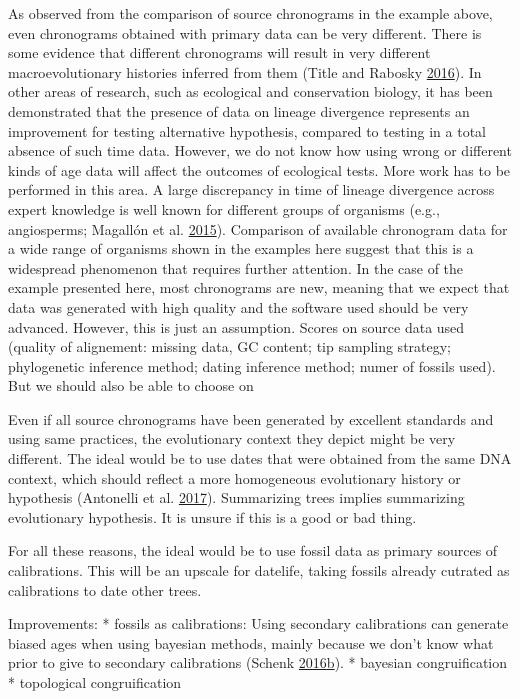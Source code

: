 \documentclass[]{article}
\begin{document}
As observed from the comparison of source chronograms in the example above, even chronograms obtained with primary data can be very different. There is some evidence that different chronograms will result in very different macroevolutionary histories inferred from them (Title and Rabosky \protect\hyperlink{ref-title2016macrophylogenies}{2016}). In other areas of research, such as ecological and conservation biology, it has been demonstrated that the presence of data on lineage divergence represents an improvement for testing alternative hypothesis, compared to testing in a total absence of such time data. However, we do not know how using wrong or different kinds of age data will affect the outcomes of ecological tests. More work has to be performed in this area.
A large discrepancy in time of lineage divergence across expert knowledge is well known for different groups of organisms (e.g., angiosperms; Magallón et al. \protect\hyperlink{ref-magallon2015metacalibrated}{2015}). Comparison of available chronogram data for a wide range of organisms shown in the examples here suggest that this is a widespread phenomenon that requires further attention.
In the case of the example presented here, most chronograms are new, meaning that we expect that data was generated with high quality and the software used should be very advanced. However, this is just an assumption. Scores on source data used (quality of alignement: missing data, GC content; tip sampling strategy; phylogenetic inference method; dating inference method; numer of fossils used). But we should also be able to choose on

Even if all source chronograms have been generated by excellent standards and using same practices, the evolutionary context they depict might be very different.
The ideal would be to use dates that were obtained from the same DNA context, which should reflect a more homogeneous evolutionary history or hypothesis (Antonelli et al. \protect\hyperlink{ref-antonelli2017supersmart}{2017}). Summarizing trees implies summarizing evolutionary hypothesis. It is unsure if this is a good or bad thing.

For all these reasons, the ideal would be to use fossil data as primary sources of calibrations. This will be an upscale for datelife, taking fossils already cutrated as calibrations to date other trees.

Improvements:
* fossils as calibrations: Using secondary calibrations can generate biased ages when using bayesian methods, mainly because we don't know what prior to give to secondary calibrations
(Schenk \protect\hyperlink{ref-Schenk2016}{2016}\protect\hyperlink{ref-Schenk2016}{b}).
* bayesian congruification
* topological congruification
\end{document}
